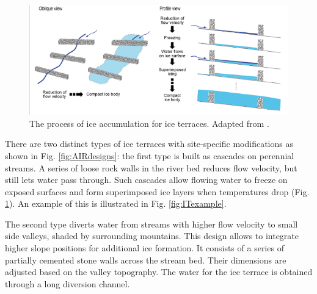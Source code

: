 \begin{figure}[htb]
	\centering
	\includegraphics[width=\textwidth]{figs/IT_science.png}

	\caption{ The process of ice accumulation for ice terraces. Adapted from
		\citet{nusserSociohydrologyArtificialGlaciers2019}.}

	\label{fig:ITscience}
\end{figure}

There are two distinct types of ice terraces with site-specific modifications as shown in Fig.
\ref{fig:AIRdesigns}: the first type is built as cascades on perennial streams. A series of loose rock walls in
the river bed reduces flow velocity, but still lets water pass through. Such cascades allow flowing water to
freeze on exposed surfaces and form superimposed ice layers when temperatures drop (Fig.
\ref{fig:ITscience}). An example of this is illustrated in Fig. \ref{fig:ITexample}.

The second type diverts water from streams with higher flow velocity to small side valleys, shaded by
surrounding mountains. This design allows to integrate higher slope positions for additional ice formation. It
consists of a series of partially cemented stone walls across the stream bed. Their dimensions are adjusted
based on the valley topography. The water for the ice terrace is obtained through a long diversion channel.


